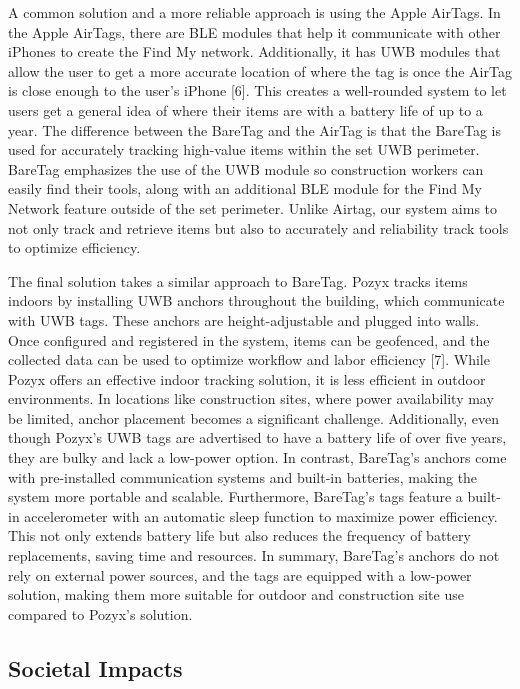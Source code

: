 \documentclass[conference]{IEEEtran}
\begin{document}
A common solution and a more reliable approach is using the Apple AirTags.
In the Apple AirTags, there are BLE modules that help it communicate 
with other iPhones to create the Find My network. Additionally, it has 
UWB modules that allow the user to get a more accurate location of where 
the tag is once the AirTag is close enough to the user’s iPhone [6]. This 
creates a well-rounded system to let users get a general idea of where 
their items are with a battery life of up to a year. The difference 
between the BareTag and the AirTag is that the BareTag is used for 
accurately tracking high-value items within the set UWB perimeter. 
BareTag emphasizes the use of the UWB module so construction workers 
can easily find their tools, along with an additional BLE module for 
the Find My Network feature outside of the set perimeter. Unlike Airtag, 
our system aims to not only track and retrieve items but also to accurately 
and reliability track tools to optimize efficiency.

The final solution takes a similar approach to BareTag. Pozyx tracks 
items indoors by installing UWB anchors throughout the building, which 
communicate with UWB tags. These anchors are height-adjustable and 
plugged into walls. Once configured and registered in the system, 
items can be geofenced, and the collected data can be used to optimize 
workflow and labor efficiency [7]. While Pozyx offers an effective 
indoor tracking solution, it is less efficient in outdoor environments. 
In locations like construction sites, where power availability may be 
limited, anchor placement becomes a significant challenge. Additionally, 
even though Pozyx’s UWB tags are advertised to have a battery life of over 
five years, they are bulky and lack a low-power option. In contrast, 
BareTag’s anchors come with pre-installed communication systems and 
built-in batteries, making the system more portable and scalable. 
Furthermore, BareTag’s tags feature a built-in accelerometer with an 
automatic sleep function to maximize power efficiency. This not only 
extends battery life but also reduces the frequency of battery 
replacements, saving time and resources. In summary, BareTag's anchors 
do not rely on external power sources, and the tags are equipped with a 
low-power solution, making them more suitable for outdoor and construction 
site use compared to Pozyx’s solution.

\subsection{Societal Impacts}
\end{document}
